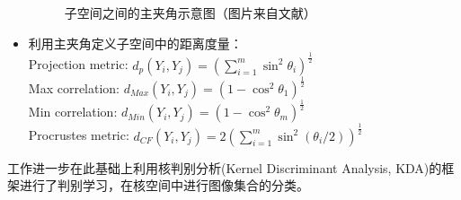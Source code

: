 \begin{itemize}
\begin{figure}[h]
	\caption[子空间之间的主夹角示意图]{子空间之间的主夹角示意图（图片来自文献\cite{Subspace_GDA}）}
	\label{fig:principle_angle}
\end{figure}
\item 利用主夹角定义子空间中的距离度量：\\
Projection metric: $d_p (Y_i,Y_j)=\left(∑_{i=1}^m \sin^2 \theta_i\right)^{\frac{1}{2}}$\\
Max correlation: $d_{Max} (Y_i,Y_j)=\left(1-\cos^2\theta_1\right)^\frac{1}{2}$\\
Min correlation: $d_{Min} (Y_i,Y_j)=\left(1-\cos^2\theta_m\right)^\frac{1}{2}$\\
Procrustes metric: $d_{CF} (Y_i,Y_j)=2\left(∑_{i=1}^{m}\sin^2(\theta_i/2)\right)^\frac{1}{2}$
\end{itemize}

工作\cite{Subspace_GDA}进一步在此基础上利用核判别分析(Kernel Discriminant Analysis, KDA)的框架进行了判别学习，在核空间中进行图像集合的分类。
